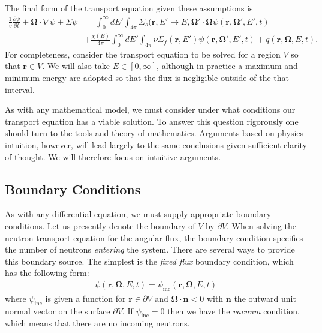 \documentclass[11pt]{article}
\renewcommand\vec{\mathbf}
\begin{document}
The final form of the transport equation given these assumptions is
\begin{align}
  \frac{1}{v} \frac{\partial\psi}{\partial t}
  + \vec{\Omega} \cdot \nabla\psi
  + \Sigma \psi
  &= \int_0^\infty dE' \int_{4\pi} \Sigma_s(\vec{r},E' \rightarrow E, \vec{\Omega}'\cdot\vec{\Omega} \psi(\vec{r},\vec{\Omega}',E',t) \\
  &+ \frac{\chi(E)}{4\pi} \int_0^\infty dE' \int_{4\pi} \nu\Sigma_f(\vec{r},E') \psi(\vec{r},\vec{\Omega}',E',t)
  + q(\vec{r},\vec{\Omega},E,t).
  \label{eq::transportEqn}
\end{align}
For completeness, consider the transport equation to be solved for a region \(V\) so that \(\vec{r} \in V\).  We will also take \(E \in [0, \infty]\), although in practice a maximum and minimum energy are adopted so that the flux is negligible outside of the that interval.

As with any mathematical model, we must consider under what conditions our transport equation has a viable solution.  To answer this question rigorously one should turn to the tools and theory of mathematics.  Arguments based on physics intuition, however, will lead largely to the same conclusions given sufficient clarity of thought.  We will therefore focus on intuitive arguments.

\subsection{Boundary Conditions}
\label{sec:orgheadline5}
As with any differential equation, we must supply appropriate boundary conditions.  Let us presently denote the boundary of \(V\) by \(\partial V\).  When solving the neutron transport equation for the angular flux, the boundary condition specifies the number of neutrons \emph{entering} the system.  There are several ways to provide this boundary source.  The simplest is the \emph{fixed flux} boundary condition, which has the following form:
\begin{align}
  \psi(\vec{r},\vec{\Omega},E,t) = \psi_\text{inc}(\vec{r},\vec{\Omega},E,t)
\end{align}
where \(\psi_\text{inc}\) is given a function for \(\vec{r} \in \partial V\) and \(\vec{\Omega} \cdot \vec{n} < 0\) with \(\vec{n}\) the outward unit normal vector on the surface \(\partial V\).  If \(\psi_\text{inc} = 0\) then we have the \emph{vacuum} condition, which means that there are no incoming neutrons.
\end{document}
